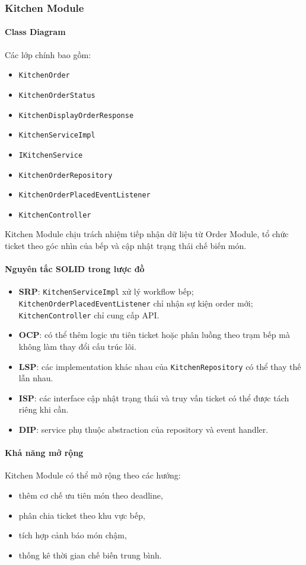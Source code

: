 \documentclass[12pt,a4paper]{article}
\begin{document}
\subsubsection{Kitchen Module}

\paragraph{Class Diagram}
Các lớp chính bao gồm:
\begin{itemize}
    \item \texttt{KitchenOrder}
    \item \texttt{KitchenOrderStatus}
    \item \texttt{KitchenDisplayOrderResponse}
    \item \texttt{KitchenServiceImpl}
    \item \texttt{IKitchenService}
    \item \texttt{KitchenOrderRepository}
    \item \texttt{KitchenOrderPlacedEventListener}
    \item \texttt{KitchenController}
\end{itemize}

Kitchen Module chịu trách nhiệm tiếp nhận dữ liệu từ Order Module, tổ chức ticket theo góc nhìn của bếp và cập nhật trạng thái chế biến món.

\paragraph{Nguyên tắc SOLID trong lược đồ}
\begin{itemize}
    \item \textbf{SRP}: \texttt{KitchenServiceImpl} xử lý workflow bếp; \texttt{KitchenOrderPlacedEventListener} chỉ nhận sự kiện order mới; \texttt{KitchenController} chỉ cung cấp API.
    \item \textbf{OCP}: có thể thêm logic ưu tiên ticket hoặc phân luồng theo trạm bếp mà không làm thay đổi cấu trúc lõi.
    \item \textbf{LSP}: các implementation khác nhau của \texttt{KitchenRepository} có thể thay thế lẫn nhau.
    \item \textbf{ISP}: các interface cập nhật trạng thái và truy vấn ticket có thể được tách riêng khi cần.
    \item \textbf{DIP}: service phụ thuộc abstraction của repository và event handler.
\end{itemize}

\paragraph{Khả năng mở rộng}
Kitchen Module có thể mở rộng theo các hướng:
\begin{itemize}
    \item thêm cơ chế ưu tiên món theo deadline,
    \item phân chia ticket theo khu vực bếp,
    \item tích hợp cảnh báo món chậm,
    \item thống kê thời gian chế biến trung bình.
\end{itemize}
\end{document}
